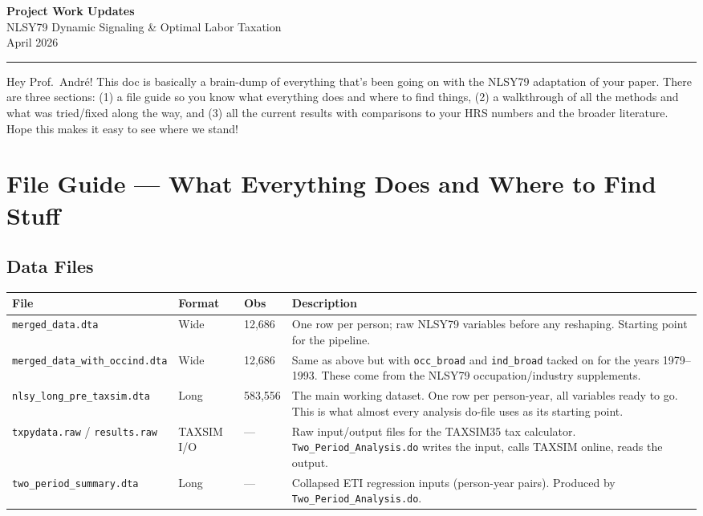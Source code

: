 \documentclass[11pt, letterpaper]{article}
\newcommand{\codebox}[1]{\texttt{\small #1}}
\newcommand{\dofile}[1]{\texttt{#1}}
\newcommand{\datafile}[1]{\texttt{#1}}
\begin{document}
\begin{center}
{\LARGE \textbf{Project Work Updates}}\\[6pt]
{\large NLSY79 Dynamic Signaling \& Optimal Labor Taxation}\\[4pt]
{\normalsize April 2026}
\end{center}
\vspace{8pt}
\hrule
\vspace{12pt}

Hey Prof.\ André! This doc is basically a brain-dump of everything that's been going on with the NLSY79 adaptation of your paper. There are three sections: (1) a file guide so you know what everything does and where to find things, (2) a walkthrough of all the methods and what was tried/fixed along the way, and (3) all the current results with comparisons to your HRS numbers and the broader literature. Hope this makes it easy to see where we stand!

\tableofcontents
\newpage

\section{File Guide --- What Everything Does and Where to Find Stuff}

\subsection{Data Files}

\begin{longtable}{p{4.8cm} p{2.2cm} p{2.2cm} p{5.8cm}}
\toprule
\textbf{File} & \textbf{Format} & \textbf{Obs} & \textbf{Description} \\
\midrule
\endhead
\datafile{merged\_data.dta} & Wide & 12,686 & One row per person; raw NLSY79 variables before any reshaping. Starting point for the pipeline. \\[4pt]
\datafile{merged\_data\_with\_occind.dta} & Wide & 12,686 & Same as above but with \codebox{occ\_broad} and \codebox{ind\_broad} tacked on for the years 1979--1993. These come from the NLSY79 occupation/industry supplements. \\[4pt]
\datafile{nlsy\_long\_pre\_taxsim.dta} & Long & 583,556 & The main working dataset. One row per person-year, all variables ready to go. This is what almost every analysis do-file uses as its starting point. \\[4pt]
\datafile{txpydata.raw} / \datafile{results.raw} & TAXSIM I/O & --- & Raw input/output files for the TAXSIM35 tax calculator. \dofile{Two\_Period\_Analysis.do} writes the input, calls TAXSIM online, reads the output. \\[4pt]
\datafile{two\_period\_summary.dta} & Long & --- & Collapsed ETI regression inputs (person-year pairs). Produced by \dofile{Two\_Period\_Analysis.do}. \\
\bottomrule
\end{longtable}
\end{document}
